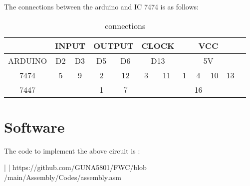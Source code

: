 \documentclass{article}
\begin{document}
 The connections between the arduino and IC 7474 is as follows:
 \begin{table}[h]
  \begin{center}
   \begin{tabular}{|c|c|c|c|c|c|c|c|c|c|c|c|}
\hline  & \multicolumn{2}{|c|}{INPUT} & \multicolumn{2}{|c|}{OUTPUT} & \multicolumn{2}{|c|}{CLOCK} & \multicolumn{4}{|c|}{VCC} \\
\hline ARDUINO & D2 & D3 & D5 & D6 & \multicolumn{2}{|c|}{D13} & \multicolumn{4}{|c|}{5V} \\
\hline 7474 & 5 & 9 & 2 & 12 & 3 & 11 & 1 & 4 & 10 & 13 \\
\hline 7447 &  &  & 1 & 7 &  &  &  & 16 &  & \\
\hline
\end{tabular}
   \caption{connections}
   \label{table:3}
  \end{center}
 \end{table}


\section{Software}
The code to implement the above circuit is : \\

\begin{tabularx}{\textwidth} { 
  | {\centering\arraybackslash} |}
  \hline
  https://github.com/GUNA5801/FWC/blob\\/main/Assembly/Codes/assembly.asm\\
  \hline
\end{tabularx}
\end{document}
